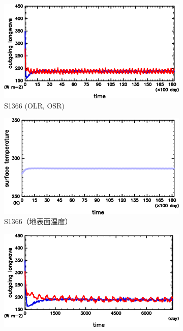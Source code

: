 \documentclass[body]{subfiles}
\begin{document}
\begin{figure}[t]
	\centering
	\begin{subfigure}{.4\textwidth}
		\centering
		\includegraphics[width=\textwidth]{S1366/S1366_OLRA-OSRA_horimean_time0.0-18250.0-crop.png}
		\caption{S1366 (OLR, OSR)}\label{S1366_OLRA}
	\end{subfigure}
	\begin{subfigure}{.4\textwidth}
		\centering
		\includegraphics[width=\textwidth]{S1366/S1366_SurfTemp_horimean_time0.0-18250.0-crop.png}
		\caption{S1366（地表面温度）}\label{S1366_SurfTemp}
	\end{subfigure}
	\begin{subfigure}{.4\textwidth}
		\centering
		\includegraphics[width=\textwidth]{S1500/S1500_OLRA-OSRA_horimean_time0.0-7300.0-crop.png}

\end{subfigure}
\end{figure}
\end{document}

